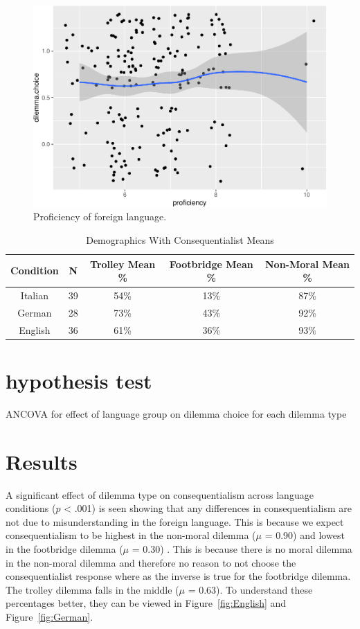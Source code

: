 \documentclass[
  man,floatsintext]{apa7}
\begin{document}
\begin{figure}
\centering
\includegraphics{FLDM_files/figure-latex/Proficiency-1.pdf}
\caption{\label{fig:Proficiency}Proficiency of foreign language.}
\end{figure}

\begin{table}
\centering
\caption{\label{tab:demographic-table}Demographics With Consequentialist Means}
\centering
\begin{tabular}[t]{c|c|c|c|c}
\hline
Condition & N & Trolley Mean \% & Footbridge Mean \% & Non-Moral Mean \%\\
\hline
Italian & 39 & 54\% & 13\% & 87\%\\
\hline
German & 28 & 73\% & 43\% & 92\%\\
\hline
English & 36 & 61\% & 36\% & 93\%\\
\hline
\end{tabular}
\end{table}

\hypertarget{hypothesis-test}{%
\section{hypothesis test}\label{hypothesis-test}}

ANCOVA for effect of language group on dilemma choice for each dilemma type

\hypertarget{results}{%
\section{Results}\label{results}}

A significant effect of dilemma type on consequentialism across language conditions (\(p\) \textless{} .001) is seen showing that any differences in consequentialism are not due to misunderstanding in the foreign language. This is because we expect consequentialism to be highest in the non-moral dilemma (\(\mu\) = 0.90) and lowest in the footbridge dilemma (\(\mu\) = 0.30) . This is because there is no moral dilemma in the non-moral dilemma and therefore no reason to not choose the consequentialist response where as the inverse is true for the footbridge dilemma. The trolley dilemma falls in the middle (\(\mu\) = 0.63). To understand these percentages better, they can be viewed in Figure~\ref{fig:English} and Figure~\ref{fig:German}.
\end{document}
